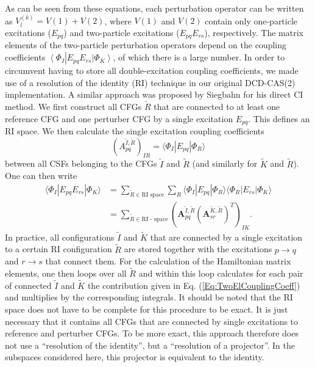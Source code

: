 As can be seen from these equations, each perturbation operator can be written as $V_l^{(k)} = V(1) + V(2)$, where $V(1)$ and $V(2)$ contain only one-particle excitations ($E_{pq}$) and two-particle excitations ($E_{pq}E_{rs}$), respectively. 
The matrix elements of the two-particle perturbation operators depend on the coupling coefficients $\left\langle {{\Phi _I}} \right.\left| {E_{pq}E_{rs}} \right.\left| {{\Phi _K}} \right\rangle $, of which there is a large number.
In order to circumvent having to store all double-excitation coupling coefficients, we made use of a resolution of the identity (RI) technique in our original DCD-CAS(2) implementation.\cite{PathaLN_2017_234109} A similar approach was proposed by Siegbahn for his direct CI method.\cite{Siegb_1984_417} We first construct all CFGs $\tilde R$ that are connected to at least one reference CFG and one perturber CFG by a single excitation $E_{pq}$. This defines an RI space. We then calculate the single excitation coupling coefficients 
\begin{equation}
(A_{pq}^{\tilde I,\tilde R})_{IR} = \langle \Phi_I | E_{pq} | \Phi_R\rangle
\end{equation}
between all CSFs belonging to the CFGs $\tilde I$ and $\tilde R$ (and similarly for $\tilde K$ and $\tilde R$). One can then write
  	 	  \begin{equation}
  	 	  \label{Eq:TwoElCouplingCoeff}
  	 	  \begin{aligned}
  	 	  \langle \Phi _I^{}|E_{pq}E_{rs}|\Phi _K^{}\rangle  &= \sum_{\tilde{R} \in \text{RI space}} \sum_R \langle \Phi _I^{}|E_{pq}|\Phi_R\rangle \langle \Phi_R |E_{rs}|\Phi _K^{}\rangle\\
  	 	  &=\sum\limits_{\tilde R \in {\text{RI - space}}} {{{\left( {\mathbf{A}_{pq}^{\tilde I,\tilde R} {{(\mathbf{A}_{sr}^{\tilde K,\tilde R})}^T}} \right)}_{IK}}}. 
  	 	  \end{aligned}
  	 	  \end{equation}				
In practice, all configurations $\tilde I$ and $\tilde K$ that are connected by a single excitation to a certain RI configuration $\tilde R$ are stored together with the excitations $p \to q$ and $r \to s$ that connect them. For the calculation of the Hamiltonian matrix elements, one then loops over all $\tilde R$ and within this loop calculates for each pair of connected $\tilde I$ and $\tilde K$ the contribution given in Eq. (\ref{Eq:TwoElCouplingCoeff}) and multiplies by the corresponding integrals. It should be noted that the RI space does not have to be complete for this procedure to be exact. It is just necessary that it contains all CFGs that are connected by single excitations to reference and perturber CFGs. To be more exact, this approach therefore does not use a ``resolution of the identity'', but a ``resolution of a projector''. In the subspaces considered here, this projector is equivalent to the identity.
